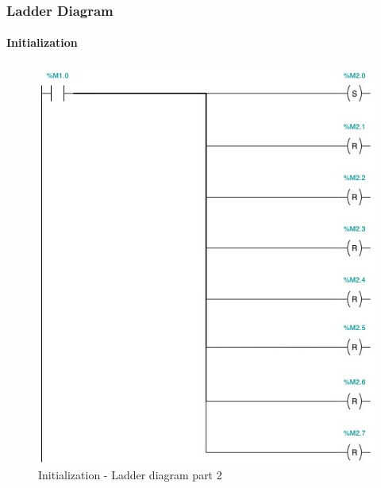 \documentclass[12pt]{beamer}
\begin{document}
\begin{frame}
\frametitle{Ladder Diagram}
\framesubtitle{Initialization}
\begin{figure}
    \centering
    \includegraphics[trim={0 0 0 11cm}, clip, scale=.5]{img/Ladder_diagram_1.jpg}
    \caption{Initialization - Ladder diagram part 2}
    \label{fig:ladder12}
\end{figure}
\end{frame}
\end{document}
